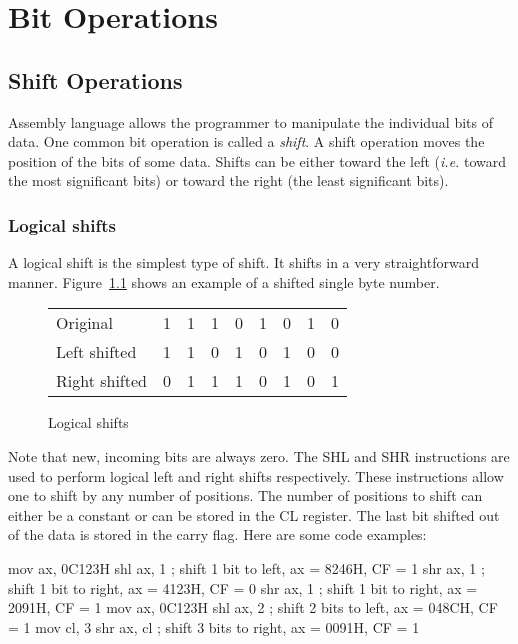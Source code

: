 \chapter{Bit Operations}
\section{Shift Operations}

Assembly language allows the programmer to manipulate the individual bits
of data. One common bit operation is called a \emph{shift}. A shift operation
moves the position of the bits of some data. Shifts can be either toward the
left (\emph{i.e.} toward the most significant bits) or toward the right
(the least significant bits).

\subsection{Logical shifts}

A logical shift is the simplest type of shift. It shifts in a very 
straightforward manner. Figure~\ref{fig:logshifts} shows an example of a
shifted single byte number.

\begin{figure}[h]
\centering
\begin{tabular}{l|c|c|c|c|c|c|c|c|}
\cline{2-9}
Original      & 1 & 1 & 1 & 0 & 1 & 0 & 1 & 0 \\
\cline{2-9}
Left shifted  & 1 & 1 & 0 & 1 & 0 & 1 & 0 & 0 \\
\cline{2-9}
Right shifted & 0 & 1 & 1 & 1 & 0 & 1 & 0 & 1 \\
\cline{2-9}
\end{tabular}
\caption{Logical shifts \label{fig:logshifts}}
\end{figure}

Note that new, incoming bits are always zero. The {\code SHL}
 and {\code SHR}  instructions are used to
perform logical left and right shifts respectively.  These
instructions allow one to shift by any number of positions. The number
of positions to shift can either be a constant or can be stored in the
{\code CL} register. The last bit shifted out of the data is stored in
the carry flag. Here are some code examples:
\begin{AsmCodeListing}[frame=none]
      mov    ax, 0C123H
      shl    ax, 1           ; shift 1 bit to left,   ax = 8246H, CF = 1
      shr    ax, 1           ; shift 1 bit to right,  ax = 4123H, CF = 0
      shr    ax, 1           ; shift 1 bit to right,  ax = 2091H, CF = 1
      mov    ax, 0C123H
      shl    ax, 2           ; shift 2 bits to left,  ax = 048CH, CF = 1
      mov    cl, 3
      shr    ax, cl          ; shift 3 bits to right, ax = 0091H, CF = 1
\end{AsmCodeListing}

